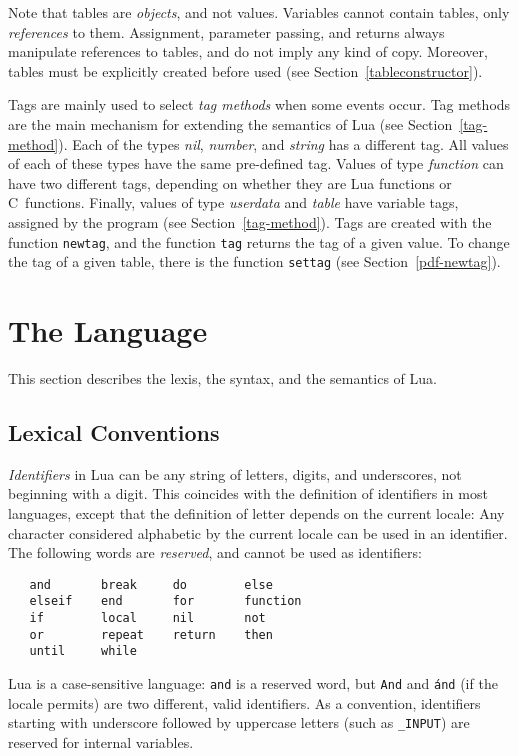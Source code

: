 \documentclass[11pt]{article}
\newcommand{\See}[1]{Section~\ref{#1}}
\newcommand{\see}[1]{(see \See{#1})}
\newcommand{\M}[1]{\rm\emph{#1}}
\newcommand{\T}[1]{{\tt #1}}
\newcommand{\IndexEmph}[1]{\emph{#1}\index{#1}}
\begin{document}
Note that tables are \emph{objects}, and not values.
Variables cannot contain tables, only \emph{references} to them.
Assignment, parameter passing, and returns always manipulate references
to tables, and do not imply any kind of copy.
Moreover, tables must be explicitly created before used
\see{tableconstructor}.

Tags are mainly used to select \emph{tag methods} when
some events occur.
Tag methods are the main mechanism for extending the
semantics of Lua \see{tag-method}.
Each of the types \M{nil}, \M{number}, and \M{string} has a different tag.
All values of each of these types have the same pre-defined tag.
Values of type \M{function} can have two different tags,
depending on whether they are Lua functions or C~functions.
Finally,
values of type \M{userdata} and \M{table} have
variable tags, assigned by the program \see{tag-method}.
Tags are created with the function \verb|newtag|,
and the function \verb|tag| returns the tag of a given value.
To change the tag of a given table,
there is the function \verb|settag| \see{pdf-newtag}.


\section{The Language}

This section describes the lexis, the syntax, and the semantics of Lua.


\subsection{Lexical Conventions} \label{lexical}

\IndexEmph{Identifiers} in Lua can be any string of letters,
digits, and underscores,
not beginning with a digit.
This coincides with the definition of identifiers in most languages,
except that
the definition of letter depends on the current locale:
Any character considered alphabetic by the current locale
can be used in an identifier.
The following words are \emph{reserved}, and cannot be used as identifiers:
\begin{verbatim}
   and       break     do        else
   elseif    end       for       function
   if        local     nil       not
   or        repeat    return    then
   until     while
\end{verbatim}
Lua is a case-sensitive language:
\T{and} is a reserved word, but \T{And} and \T{\'and}
(if the locale permits) are two different, valid identifiers.
As a convention, identifiers starting with underscore followed by
uppercase letters (such as \verb|_INPUT|)
are reserved for internal variables.
\end{document}

